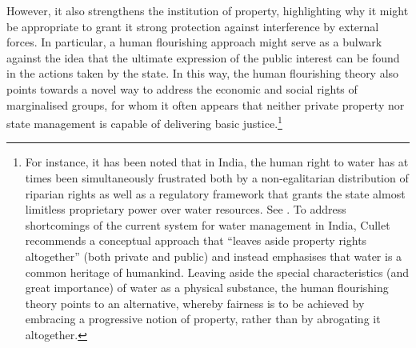 However, it also strengthens the institution of property, highlighting why it might be appropriate to grant it strong protection against interference by external forces. In particular, a human flourishing approach might serve as a bulwark against the idea that the ultimate expression of the public interest can be found in the actions taken by the state. In this way, the human flourishing theory also points towards a novel way to address the economic and social rights of marginalised groups, for whom it often appears that neither private property nor state management is capable of delivering basic justice.\footnote{For instance, it has been noted that in India, the human right to water has at times been simultaneously frustrated both by a non-egalitarian distribution of riparian rights as well as a regulatory framework that grants the state almost limitless proprietary power over water resources. See \cite[186]{cullet09}.
To address shortcomings of the current system for water management in India, Cullet recommends a conceptual approach that ``leaves aside property rights altogether'' (both private and public) and instead emphasises that water is a common heritage of humankind. Leaving aside the special characteristics (and great importance) of water as a physical substance, the human flourishing theory points to an alternative, whereby fairness is to be achieved by embracing a progressive notion of property, rather than by abrogating it altogether.}
